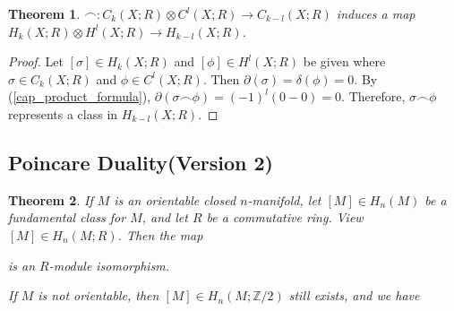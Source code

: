 \documentclass[psamsfonts]{amsart}
\newtheorem{thm}{Theorem}[section]
\theoremstyle{definition}
\theoremstyle{rem}
\numberwithin{equation}{section}
\begin{document}
\begin{thm}
  $\frown: C_k(X; R) \otimes C^l(X; R) \rightarrow C_{k - l}(X; R)$ induces a map $H_k(X; R) \otimes H^l(X; R) \rightarrow H_{k - l}(X; R)$.
\end{thm}

\begin{proof}
  Let $[\sigma] \in H_k(X; R)$ and $[\phi] \in H^l(X; R)$ be given where $\sigma \in C_k(X; R)$ and $\phi \in C^l(X; R)$.
  Then $\partial(\sigma) = \delta(\phi) = 0$.
  By (\ref{cap_product_formula}), $\partial(\sigma \frown \phi) = (-1)^l(0 - 0) = 0$.
  Therefore, $\sigma \frown \phi$ represents a class in $H_{k - l}(X; R)$.
\end{proof}

\subsection{Poincare Duality(Version 2)}

\begin{thm}\label{poincare_duality_2}
  If $M$ is an orientable closed $n$-manifold, let $[M] \in H_n(M)$ be a fundamental class for $M$, and let $R$ be a commutative ring.
  View $[M] \in H_n(M; R)$.
  Then the map
  \begin{center}
  \end{center}
  is an $R$-module isomorphism.

  If $M$ is not orientable, then $[M] \in H_n(M; \mathbb{Z} / 2)$ still exists, and we have
  \begin{center}
  \end{center}
\end{thm}
\end{document}
